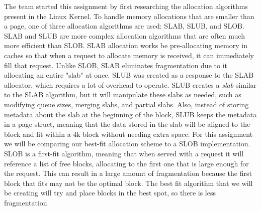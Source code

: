 \documentclass[10pt,onecolumn,draftclsnofoot]{IEEEtran} %
\begin{document}
\begin{singlespace}
  \normalfont \indent The team started this assignment by first researching the allocation algorithms present in the Linux Kernel. To handle memory allocations that are smaller than a page, one of three allocation algorithms are used: SLAB, SLUB, and SLOB.  SLAB and SLUB are more complex allocation algorithms that are often much more efficient than SLOB.  SLAB allocation works be pre-allocating memory in caches so that when a request to allocate memory is received, it can immediately fill that request.  Unlike SLOB, SLAB eliminates fragmentation due to it allocating an entire "slab" at once.  SLUB was created as a response to the SLAB allocator, which requires a lot of overhead to operate.  SLUB creates a \textit{slab} similar to the SLAB algorithm, but it will manipulate these slabs as needed, such as modifying queue sizes, merging slabs, and partial slabs.  Also, instead of storing metadata about the slab at the beginning of the block, SLUB keeps the metadata in a page struct, meaning that the data stored in the slab will be aligned to the block and fit within a 4k block without needing extra space. 
  \normalfont \indent For this assignment we will be comparing our best-fit allocation scheme to a SLOB implementation.  SLOB is a first-fit algorithm, meaning that when served with a request it will reference a list of free blocks, allocating to the first one that is large enough for the request.  This can result in a large amount of fragmentation because the first block that fits may not be the optimal block. The best fit algorithm that we will be creating will try and place blocks in the best spot, so there is less fragmentation  

\end{singlespace}
\end{document}
